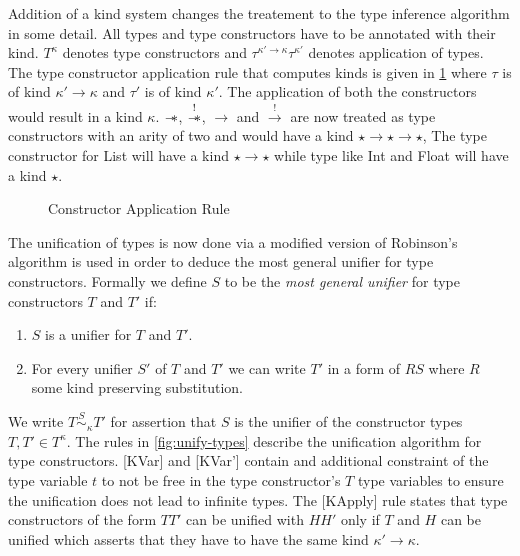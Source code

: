 Addition of a kind system changes the treatement to the type inference algorithm in some detail.
All types and type constructors have to be annotated with their kind. $T^\kappa$ denotes type constructors
and $\tau^{\kappa' \rightarrow \kappa}\tau^{\kappa'}$ denotes application of types.
The type constructor application rule that computes kinds is given in \cref{fig:constructor-application} where
$\tau$ is of kind $\kappa' \rightarrow \kappa$ and $\tau'$ is of kind $\kappa'$. The application
of both the constructors would result in a kind $\kappa$.
$\sepimp$, $\overset{!}{\sepimp}$, $\rightarrow$ and $\overset{!}{\rightarrow}$
are now treated as type constructors with an arity of two and would have a kind $\star \rightarrow \star \rightarrow \star$, The
type constructor for List will have a kind $\star \rightarrow \star$ while
type like Int and Float will have a kind $\star$.

\begin{figure}
  \begin{framed}
    \begin{prooftree}
    \end{prooftree}
  \end{framed}
  \caption{Constructor Application Rule}
  \label{fig:constructor-application}
\end{figure}

The unification of types is now done via a modified version of Robinson's algorithm \citeyearpar{robinson_machine-oriented_1965}
is used in order to deduce the most general unifier for type constructors.
Formally we define $S$ to be the {\it most general unifier} for type constructors $T$ and $T'$ if:
\begin{enumerate}
  \item $S$ is a unifier for $T$ and $T'$.
  \item For every unifier $S'$ of $T$ and $T'$ we can write $T'$ in a form of
    $R S$ where $R$ some kind preserving substitution.
\end{enumerate}
We write $T \overset{S}{\sim}_{\kappa} T'$ for assertion that $S$ is the unifier
of the constructor types $T, T' \in T^{\kappa}$. The rules in \cref{fig:unify-types}
describe the unification algorithm for type constructors. [KVar] and [KVar'] contain
and additional constraint of the type variable $t$ to not be free in the type constructor's $T$
type variables to ensure the unification does not lead to infinite types. The [KApply] rule
states that type constructors of the form $T T'$ can be unified with $H H'$ only if $T$ and $H$
can be unified which asserts that they have to have the same kind $\kappa' \rightarrow \kappa$.


